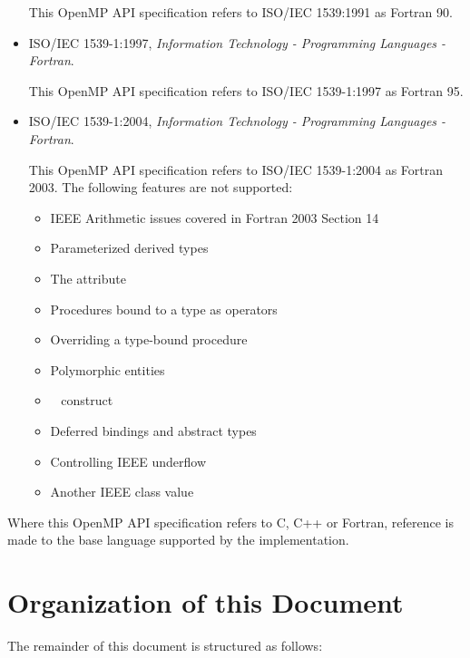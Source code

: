 \begin{itemize}
This OpenMP API specification refers to ISO/IEC 1539:1991 as Fortran 90.

\item ISO/IEC 1539-1:1997, \textsl{Information Technology - Programming Languages - Fortran}.

This OpenMP API specification refers to ISO/IEC 1539-1:1997 as Fortran 95.

\item ISO/IEC 1539-1:2004, \textsl{Information Technology - Programming Languages - Fortran}.


This OpenMP API specification refers to ISO/IEC 1539-1:2004 as Fortran 2003. The 
following features are not supported:

\begin{itemize}
\item IEEE Arithmetic issues covered in Fortran 2003 Section 14

\item Parameterized derived types

\item The  attribute

\item Procedures bound to a type as operators

\item Overriding a type-bound procedure

\item Polymorphic entities

\item {}~ construct

\item Deferred bindings and abstract types

\item Controlling IEEE underflow

\item Another IEEE class value 
\end{itemize}
\end{itemize}

Where this OpenMP API specification refers to C, C++ or Fortran, reference is made to 
the base language supported by the implementation.








\pagebreak
\section{Organization of this Document}
\label{sec:Organization of this document}
The remainder of this document is structured as follows: 

